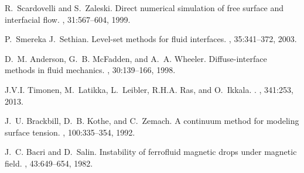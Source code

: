 \begin{thebibliography}{10}
R.~Scardovelli and S.~Zaleski.
\newblock Direct numerical simulation of free surface and interfacial flow.
, 31:567--604, 1999.

P.~Smereka J.~Sethian.
\newblock Level-set methods for fluid interfaces.
, 35:341--372, 2003.

D.~M. Anderson, G.~B. McFadden, and A.~A. Wheeler.
\newblock Diffuse-interface methods in fluid mechanics.
, 30:139--166, 1998.

J.V.I. Timonen, M.~Latikka, L.~Leibler, R.H.A. Ras, and O.~Ikkala.
.
, 341:253, 2013.

J.~U. Brackbill, D.~B. Kothe, and C.~Zemach.
\newblock A continuum method for modeling surface tension.
, 100:335--354, 1992.

J.~C. Bacri and D.~Salin.
\newblock Instability of ferrofluid magnetic drops under magnetic field.
, 43:649--654, 1982.

\end{thebibliography}

 
